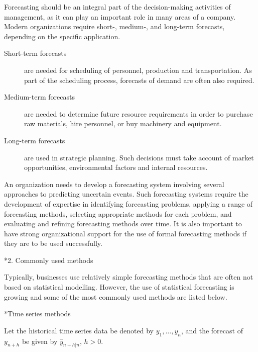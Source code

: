 \documentclass[10pt]{article}
\makeatletter
\renewcommand{\section}%
{\@startsection{section}{1}{0mm}{\baselineskip}{0.5\baselineskip}{\normalfont\large\rmfamily\bfseries}}
\renewcommand{\subsection}%
{\@startsection{subsection}{1}{0mm}{\baselineskip}{0.5\baselineskip}{\normalfont\rmfamily\bfseries}}
\makeatother
\begin{document}
Forecasting should be an integral part of the decision-making activities of management, as it can play an important role in many areas of a company. Modern organizations require short-, medium-, and long-term forecasts, depending on the specific application.
\begin{description}
\item[Short-term forecasts] are needed for scheduling of personnel, production and transportation. As part of the scheduling process, forecasts of demand are often also required.     
\item[Medium-term forecasts] are needed to determine future resource requirements in order to purchase raw materials, hire personnel, or buy machinery and equipment.
\item[Long-term forecasts] are used in strategic planning. Such decisions must take account of market opportunities, environmental factors and internal resources. 
\end{description}
An organization needs to develop a forecasting system involving several approaches to predicting uncertain events. Such forecasting systems require the development of expertise in identifying forecasting problems, applying a range of forecasting methods, selecting appropriate methods for each problem, and evaluating and refining forecasting methods over time. It is also important to have strong organizational support for the use of formal forecasting methods if they are to be used successfully.
 

\section*{2. Commonly used methods}

Typically, businesses use relatively simple forecasting methods that are often not based on statistical modelling. However, the use of statistical forecasting is growing and some of the most commonly used methods are listed below.

\subsection*{Time series methods}

Let the historical time series data be denoted by $y_1,\dots,y_n$, and the forecast of $y_{n+h}$ be given by $\hat{y}_{n+h|n}$, $h>0$.
\end{document}
